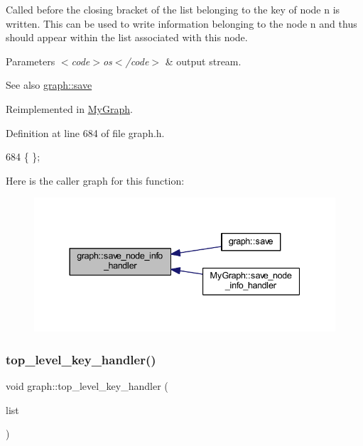 Called before the closing bracket of the list belonging to the key of node {\ttfamily n} is written. This can be used to write information belonging to the node {\ttfamily n} and thus should appear within the list associated with this node.


\begin{DoxyParams}{Parameters}
{\em $<$code$>$os$<$/code$>$} & output stream. \\
\hline
\end{DoxyParams}
\begin{DoxySeeAlso}{See also}
\mbox{\hyperlink{classgraph_a7bd0712a528249d1585085a64ac3e661}{graph\+::save}} 
\end{DoxySeeAlso}


Reimplemented in \mbox{\hyperlink{class_my_graph_ad5f4b3ce70135723fe08a301d20c4a8a}{My\+Graph}}.



Definition at line 684 of file graph.\+h.


\begin{DoxyCode}
684 \{ \};
\end{DoxyCode}
Here is the caller graph for this function\+:\nopagebreak
\begin{figure}[H]
\begin{center}
\leavevmode
\includegraphics[width=337pt]{classgraph_a994f87e1b7f1f723cf03e54e2eb7a99d_icgraph}
\end{center}
\end{figure}
\mbox{\label{classgraph_a33bc9b45f0d4738c491535147b703cc5}} 
\subsubsection{\texorpdfstring{top\+\_\+level\+\_\+key\+\_\+handler()}{top\_level\_key\_handler()}}
{\footnotesize\ttfamily void graph\+::top\+\_\+level\+\_\+key\+\_\+handler (\begin{DoxyParamCaption}\item[{\mbox{\hyperlink{struct_g_m_l__pair}{G\+M\+L\+\_\+pair}} $\ast$}]{list }\end{DoxyParamCaption})\hspace{0.3cm}{\ttfamily [virtual]}}

